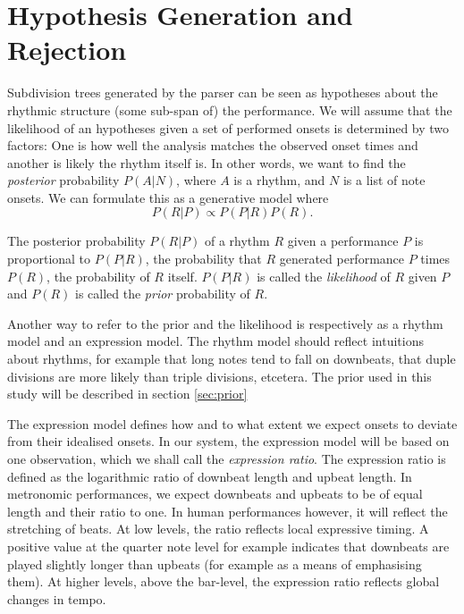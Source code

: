 \section{Hypothesis Generation and Rejection}
\label{sec:rejection}

Subdivision trees generated by the parser can be seen as hypotheses about the rhythmic structure (some sub-span of) the performance. We will assume that the likelihood of an hypotheses given a set of performed onsets is determined by two factors: One is how well the analysis matches the observed onset times and another is likely the rhythm itself is. In other words, we want to find the \textit{posterior} probability $P(A|N)$, where $A$ is a rhythm, and $N$ is a list of note onsets. We can formulate this as a generative model where
\begin{equation}
\label{eq:model}
P(R|P) \propto P(P|R)P(R).
\end{equation}

The posterior probability $P(R|P)$ of a rhythm $R$ given a performance $P$ is proportional to $P(P|R)$, the probability that $R$ generated performance $P$ times $P(R)$, the probability of $R$ itself. $P(P|R)$ is called the \textit{likelihood} of $R$ given $P$ and $P(R)$ is called the \textit{prior} probability of $R$.

Another way to refer to the prior and the likelihood is respectively as a rhythm model and an expression model. The rhythm model should reflect intuitions about rhythms, for example that long notes tend to fall on downbeats, that duple divisions are more likely than triple divisions, etcetera. The prior used in this study will be described in section \ref{sec:prior}

The expression model defines how and to what extent we expect onsets to deviate from their idealised onsets. In our system, the expression model will be based on one observation, which we shall call the \textit{expression ratio}. The expression ratio is defined as the logarithmic ratio of downbeat length and upbeat length. In metronomic performances, we expect downbeats and upbeats to be of equal length and their ratio to one. In human performances however, it will reflect the stretching of beats. At low levels, the ratio reflects local expressive timing. A positive value at the quarter note level for example indicates that downbeats are played slightly longer than upbeats (for example as a means of emphasising them). At higher levels, above the bar-level, the expression ratio reflects global changes in tempo.

